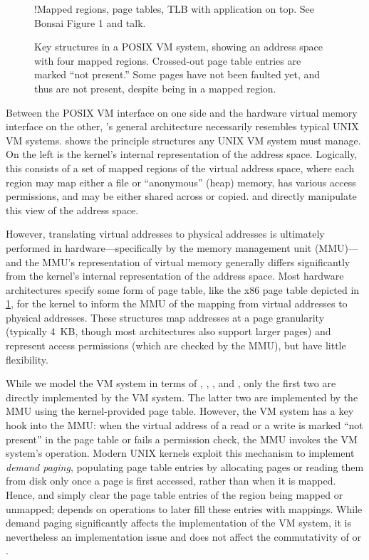 \begin{figure}
  \centering
  \XXX!{Mapped regions, page tables, TLB with application on top.  See
    Bonsai Figure 1 and \vm talk.}
  \caption[Key structures in a POSIX VM system.]{Key structures in a
    POSIX VM system, showing an address space with four mapped
    regions.  Crossed-out page table entries are marked ``not
    present.''  Some pages have not been faulted yet, and thus are not
    present, despite being in a mapped region.}
  \label{fig:vm-structures}
\end{figure}

Between the POSIX VM interface on one side and the hardware virtual
memory interface on the other, \vm's general architecture necessarily
resembles typical UNIX VM systems.   shows the
principle structures any UNIX VM system must manage.  On the left is
the kernel's internal representation of the address space.  Logically,
this consists of a set of mapped regions of the virtual address space,
where each region may map either a file or ``anonymous'' (heap)
memory, has various access permissions, and may be either shared
across  or copied.   and  directly
manipulate this view of the address space.

However, translating virtual addresses to physical addresses is
ultimately performed in hardware---specifically by the memory
management unit (MMU)---and the MMU's representation of virtual memory
generally differs significantly from the kernel's internal
representation of the address space.  Most hardware architectures
specify some form of page table, like the x86 page table depicted in
\cref{fig:vm-structures}, for the kernel to inform the MMU of the
mapping from virtual addresses to physical addresses.  These
structures map addresses at a page granularity (typically 4~KB, though
most architectures also support larger pages) and represent access
permissions (which are checked by the MMU), but have little
flexibility.

While we model the VM system in terms of , ,
, and , only the first two are directly
implemented by the VM system.  The latter two are implemented by the
MMU using the kernel-provided page table.  However, the VM system has
a key hook into the MMU: when the virtual address of a read or a write
is marked ``not present'' in the page table or fails a permission
check, the MMU invokes the VM system's  operation.
Modern UNIX kernels exploit this mechanism to implement \emph{demand
  paging}, populating page table entries by allocating pages or
reading them from disk only once a page is first accessed, rather than
when it is mapped.
%
Hence,  and  simply clear the page table
entries of the region being mapped or unmapped;  depends on
 operations to later fill these entries with mappings.
%
While demand paging significantly affects the implementation of the VM
system, it is nevertheless an implementation issue and does not affect
the commutativity of  or .

